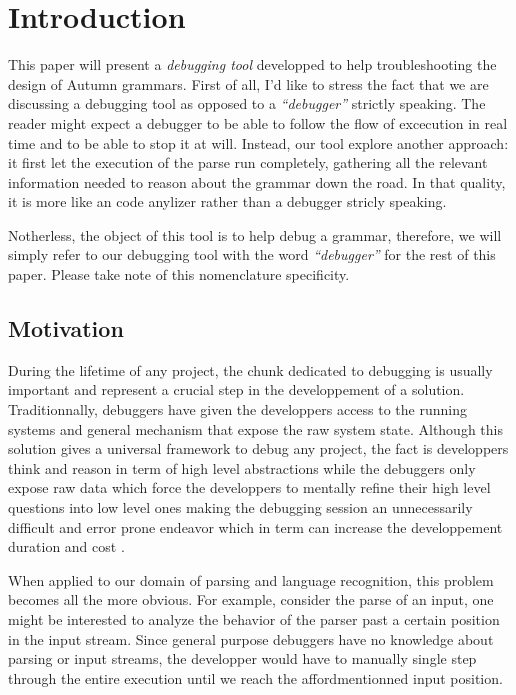 \chapter{Introduction}

This paper will present a \textit{debugging tool} developped to help troubleshooting the design of Autumn grammars. First of all, I'd like to stress the fact that we are discussing a debugging tool as opposed to a \textit{``debugger''} strictly speaking. The reader might expect a debugger to be able to follow the flow of excecution in real time and to be able to stop it at will. Instead, our tool explore another approach: it first let the execution of the parse run completely, gathering all the relevant information needed to reason about the grammar down the road. In that quality, it is more like an code anylizer rather than a debugger stricly speaking.

\bigskip

Notherless, the object of this tool is to help debug a grammar, therefore, we will simply refer to our debugging tool with the word \textit{``debugger''} for the rest of this paper. Please take note of this nomenclature specificity. 

\bigskip

\section{Motivation}

During the lifetime of any project, the chunk dedicated to debugging is usually important and represent a crucial step in the developpement of a solution. Traditionnally, debuggers have given the developpers access to the running systems and general mechanism that expose the raw system state. Although this solution gives a universal framework to debug any project, the fact is developpers think and reason in term of high level abstractions while the debuggers only expose raw data which force the developpers to mentally refine their high level questions into low level ones making the debugging session an unnecessarily difficult and error prone endeavor which in term can increase the developpement duration and cost \cite{economicdebug}.

\bigskip

When applied to our domain of parsing and language recognition, this problem becomes all the more obvious. For example, consider the parse of an input, one might be interested to analyze the behavior of the parser past a certain position in the input stream. Since general purpose debuggers have no knowledge about parsing or input streams, the developper would have to manually single step through the entire execution until we reach the affordmentionned input position.

